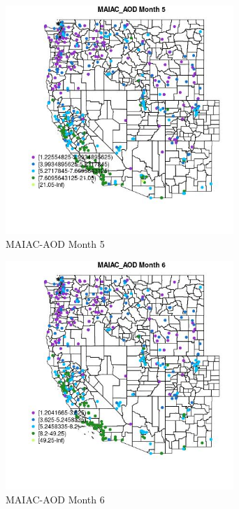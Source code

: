 \begin{figure} 
\centering  
\includegraphics[width=0.77\textwidth]{Code_Outputs/ML_input_report_ML_input_PM25_Step5_part_d_de_duplicated_aves_ML_input_MapObsMo5MAIAC_AOD.jpg} 
\caption{\label{fig:ML_input_report_ML_input_PM25_Step5_part_d_de_duplicated_aves_ML_inputMapObsMo5MAIAC_AOD}MAIAC-AOD Month 5} 
\end{figure} 
 

\begin{figure} 
\centering  
\includegraphics[width=0.77\textwidth]{Code_Outputs/ML_input_report_ML_input_PM25_Step5_part_d_de_duplicated_aves_ML_input_MapObsMo6MAIAC_AOD.jpg} 
\caption{\label{fig:ML_input_report_ML_input_PM25_Step5_part_d_de_duplicated_aves_ML_inputMapObsMo6MAIAC_AOD}MAIAC-AOD Month 6} 
\end{figure} 
 

